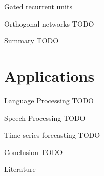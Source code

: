 \documentclass{beamer}
\begin{document}
    \begin{frame}{Gated recurrent units}
      \begin{figure}
      
      \end{figure}
    \end{frame}

    \begin{frame}{Orthogonal networks}
      TODO
    \end{frame}

    \begin{frame}{Summary}
      TODO
    \end{frame}

    \section{Applications}
    \begin{frame}{Language Processing}
      TODO
    \end{frame}

    \begin{frame}{Speech Processing}
      TODO
    \end{frame}

    \begin{frame}{Time-series forecasting}
      TODO
    \end{frame}


    \begin{frame}{Conclusion}
      TODO
    \end{frame}

    \begin{frame}{Literature}
      \printbibliography
    \end{frame}
\end{document}
